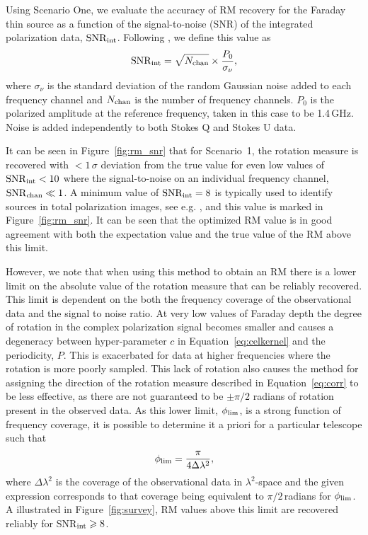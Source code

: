 \documentclass[fleqn,usenatbib]{mnras}
\begin{document}
Using Scenario One, we evaluate the accuracy of RM recovery for the Faraday thin source as a function of the signal-to-noise (SNR) of the integrated polarization data, ${\rm SNR}_{\rm int}$. Following \cite{2018arXiv180604326S}, we define this value as
%
\begin{equation}
{\rm SNR}_{\rm int} = \sqrt{N_{\rm chan}} \times \frac{P_0}{\sigma_{\nu}},
\end{equation}
%
where $\sigma_{\nu}$ is the standard deviation of the random Gaussian noise added to each frequency channel and $N_{\rm chan}$ is the number of frequency channels. $P_0$ is the polarized amplitude at the reference frequency, taken in this case to be 1.4\,GHz. Noise is added independently to both Stokes Q and Stokes U data.

It can be seen in Figure~\ref{fig:rm_snr} that for Scenario~1, the rotation measure is recovered with $< 1\,\sigma$ deviation from the true value for even low values of ${\rm SNR}_{\rm int}<10$ where the signal-to-noise on an individual frequency channel, ${\rm SNR}_{\rm chan}\ll 1$. A minimum value of ${\rm SNR}_{\rm int}=8$ is typically used to identify sources in total polarization images, see e.g. \cite{george_stil_keller_2012}, and this value is marked in Figure~\ref{fig:rm_snr}. It can be seen that the optimized RM value is in good agreement with both the expectation value and the true value of the RM above this limit.

However, we note that when using this method to obtain an RM there is a lower limit on the absolute value of the rotation measure that can be reliably recovered. This limit is dependent on the both the frequency coverage of the observational data and the signal to noise ratio. At very low values of Faraday depth the degree of rotation in the complex polarization signal becomes smaller and causes a degeneracy between hyper-parameter $c$ in Equation~\ref{eq:celkernel} and the periodicity, $P$. This is exacerbated for data at higher frequencies where the rotation is more poorly sampled. This lack of rotation also causes the method for assigning the direction of the rotation measure described in Equation~\ref{eq:corr} to be less effective, as there are not guaranteed to be $\pm\pi/2$ radians of rotation present in the observed data. As this lower limit, $\phi_{\rm lim}$, is a strong function of frequency coverage, it is possible to determine it a priori for a particular telescope such that
%
\begin{equation}
\label{eq:rmlim}
    \phi_{\rm lim} = \frac{\pi}{4\Delta \lambda^2},
\end{equation}
%
where $\Delta \lambda^2$ is the coverage of the observational data in $\lambda^2$-space and the given expression corresponds to that coverage being equivalent to $\pi/2$\,radians for $\phi_{\rm lim}$.  A illustrated in Figure~\ref{fig:survey}, RM values above this limit are recovered reliably for SNR$_{\rm int}\ge 8$.
\end{document}
